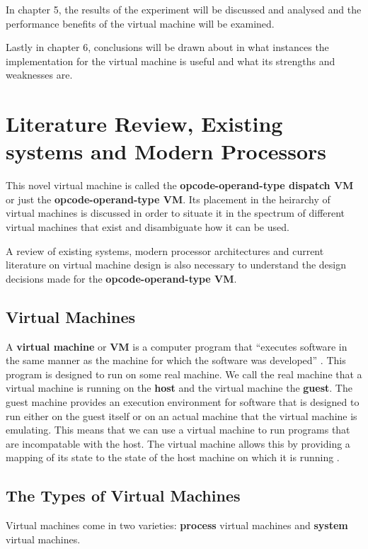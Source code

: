 \documentclass[english,a4paper]{article}
\begin{document}
In chapter 5, the results of the experiment will be discussed and
analysed and the performance benefits of the virtual machine will be
examined.

Lastly in chapter 6, conclusions will be drawn about in what instances
the implementation for the virtual machine is useful and what its
strengths and weaknesses are.
\newpage{}

\section{Literature Review, Existing systems and Modern Processors}
This novel virtual machine is called the \textbf{opcode-operand-type
  dispatch VM} or just the \textbf{opcode-operand-type VM}. Its
placement in the heirarchy of virtual machines is discussed in order
to situate it in the spectrum of different virtual machines that exist
and disambiguate how it can be used.

A review of existing systems, modern processor architectures and
current literature on virtual machine design is also necessary to
understand the design decisions made for the \textbf{opcode-operand-type
  VM}.

\subsection{Virtual Machines}
A \textbf{virtual machine} or \textbf{VM} is a computer program that
``executes software in the same manner as the machine for which the
software was developed'' \cite[pg9]{JamesE.Smith2005}. This program is
designed to run on some real machine. We call the real machine that a
virtual machine is running on the \textbf{host} and the virtual machine
the \textbf{guest}. The guest machine provides an execution environment
for software that is designed to run either on the guest itself or on
an actual machine that the virtual machine is emulating. This means
that we can use a virtual machine to run programs that are
incompatable with the host. The virtual machine allows this by
providing a mapping of its state to the state of the host machine on
which it is running \cite[pg4]{JamesE.Smith2005}.

\subsection{The Types of Virtual Machines}
Virtual machines come in two varieties: \textbf{process } virtual
machines and \textbf{system} virtual machines.
\end{document}
